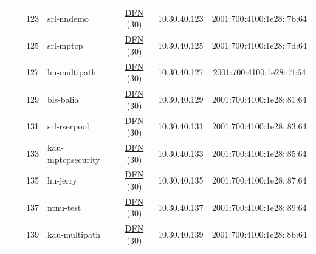 \begin{small}
\begin{center}
\begin{longtable}{|c|c|c|c|c|c|c|c|}
  &  & \tiny{123} & \multicolumn{1}{|l|}{\tiny{srl-nndemo}} & \multicolumn{2}{|c|}{\tiny{\href{https://www.dfn.de}{DFN} (30)}} & \tiny{10.30.40.123} & \tiny{2001:700:4100:1e28::7b:64} \\* \cline{3-3}\cline{4-4}\cline{5-5}\cline{6-6}\cline{7-7}\cline{8-8}
  &  & \tiny{125} & \multicolumn{1}{|l|}{\tiny{srl-mptcp}} & \multicolumn{2}{|c|}{\tiny{\href{https://www.dfn.de}{DFN} (30)}} & \tiny{10.30.40.125} & \tiny{2001:700:4100:1e28::7d:64} \\* \cline{3-3}\cline{4-4}\cline{5-5}\cline{6-6}\cline{7-7}\cline{8-8}
  &  & \tiny{127} & \multicolumn{1}{|l|}{\tiny{hu-multipath}} & \multicolumn{2}{|c|}{\tiny{\href{https://www.dfn.de}{DFN} (30)}} & \tiny{10.30.40.127} & \tiny{2001:700:4100:1e28::7f:64} \\* \cline{3-3}\cline{4-4}\cline{5-5}\cline{6-6}\cline{7-7}\cline{8-8}
  &  & \tiny{129} & \multicolumn{1}{|l|}{\tiny{bls-balia}} & \multicolumn{2}{|c|}{\tiny{\href{https://www.dfn.de}{DFN} (30)}} & \tiny{10.30.40.129} & \tiny{2001:700:4100:1e28::81:64} \\* \cline{3-3}\cline{4-4}\cline{5-5}\cline{6-6}\cline{7-7}\cline{8-8}
  &  & \tiny{131} & \multicolumn{1}{|l|}{\tiny{srl-rserpool}} & \multicolumn{2}{|c|}{\tiny{\href{https://www.dfn.de}{DFN} (30)}} & \tiny{10.30.40.131} & \tiny{2001:700:4100:1e28::83:64} \\* \cline{3-3}\cline{4-4}\cline{5-5}\cline{6-6}\cline{7-7}\cline{8-8}
  &  & \tiny{133} & \multicolumn{1}{|l|}{\tiny{kau-mptcpsecurity}} & \multicolumn{2}{|c|}{\tiny{\href{https://www.dfn.de}{DFN} (30)}} & \tiny{10.30.40.133} & \tiny{2001:700:4100:1e28::85:64} \\* \cline{3-3}\cline{4-4}\cline{5-5}\cline{6-6}\cline{7-7}\cline{8-8}
  &  & \tiny{135} & \multicolumn{1}{|l|}{\tiny{hu-jerry}} & \multicolumn{2}{|c|}{\tiny{\href{https://www.dfn.de}{DFN} (30)}} & \tiny{10.30.40.135} & \tiny{2001:700:4100:1e28::87:64} \\* \cline{3-3}\cline{4-4}\cline{5-5}\cline{6-6}\cline{7-7}\cline{8-8}
  &  & \tiny{137} & \multicolumn{1}{|l|}{\tiny{ntnu-test}} & \multicolumn{2}{|c|}{\tiny{\href{https://www.dfn.de}{DFN} (30)}} & \tiny{10.30.40.137} & \tiny{2001:700:4100:1e28::89:64} \\* \cline{3-3}\cline{4-4}\cline{5-5}\cline{6-6}\cline{7-7}\cline{8-8}
  &  & \tiny{139} & \multicolumn{1}{|l|}{\tiny{kau-multipath}} & \multicolumn{2}{|c|}{\tiny{\href{https://www.dfn.de}{DFN} (30)}} & \tiny{10.30.40.139} & \tiny{2001:700:4100:1e28::8b:64} \\* \cline{3-3}\cline{4-4}\cline{5-5}\cline{6-6}\cline{7-7}\cline{8-8}

\end{longtable}
\end{center}
\end{small}
